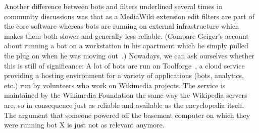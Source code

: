 Another difference between bots and filters underlined several times in community discussions was that as a MediaWiki extension edit filters are part of the core software whereas bots are running on external infrastructure which makes them both slower and generally less reliable.
(Compare Geiger's account about running a bot on a workstation in his apartment which he simply pulled the plug on when he was moving out~\cite{Geiger2014}.)
Nowadays, we can ask ourselves whether this is still of significance:
A lot of bots are run on Toolforge~\cite{Wikimedia:Toolforge}, a cloud service providing a hosting environment for a variety of applications (bots, analytics, etc.) run by volunteers who work on Wikimedia projects.
The service is maintained by the Wikimedia Foundation the same way the Wikipedia servers are, so in consequence just as reliable and available as the encyclopedia itself.
The argument that someone powered off the basement computer on which they were running bot X is just not as relevant anymore.


